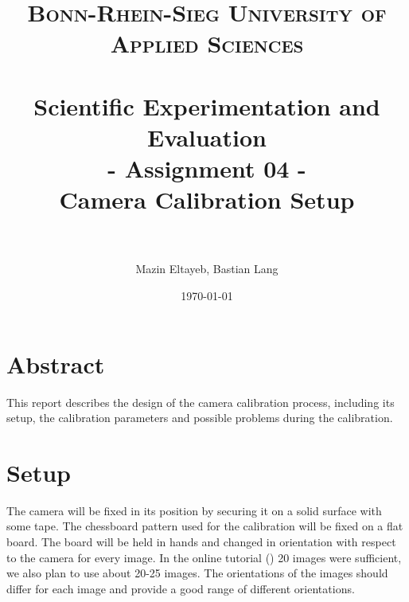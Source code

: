 \documentclass[paper=a4, fontsize=11pt]{scrartcl} %
\title{	
\normalfont \normalsize 
\textsc{Bonn-Rhein-Sieg University of Applied Sciences} \\ [25pt] %
\horrule{0.5pt} \\[0.4cm] %
\huge Scientific Experimentation and Evaluation\\
- Assignment 04 - \\ 
Camera Calibration Setup\\%
\horrule{2pt} \\[0.5cm] %
}
\author{Mazin Eltayeb, Bastian Lang} %
\date{\normalsize\today} %
\numberwithin{equation}{section} %
\numberwithin{figure}{section} %
\numberwithin{table}{section} %
\begin{document}
\maketitle %

\tableofcontents
\newpage

\section{Abstract}
This report describes the design of the camera calibration process, including its setup, the calibration parameters and possible problems during the calibration.

\section{Setup}
The camera will be fixed in its position by securing it on a solid surface with some tape.
The chessboard pattern used for the calibration will be fixed on a flat board. 
The board will be held in hands and changed in orientation with respect to the camera for every image.
In the online tutorial (\cite{tutorial}) 20 images were sufficient, we also plan to use about 20-25 images.
The orientations of the images should differ for each image and provide a good range of different orientations.
\end{document}
